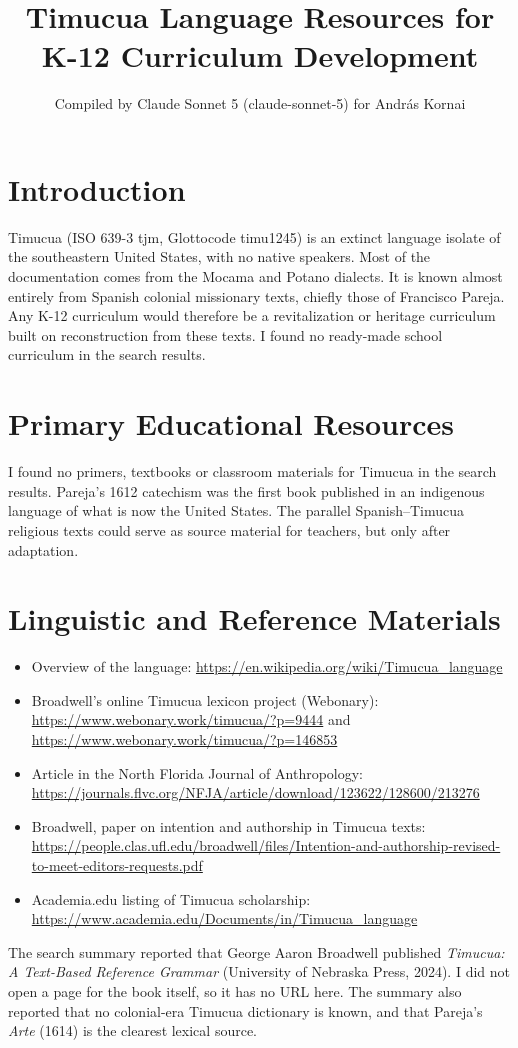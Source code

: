 \documentclass[12pt]{article}
\title{Timucua Language Resources for K-12 Curriculum Development}
\author{Compiled by Claude Sonnet 5 (claude-sonnet-5) for Andr\'as Kornai}
\date{}
\begin{document}
\maketitle

\section{Introduction}
Timucua (ISO 639-3 tjm, Glottocode timu1245) is an extinct language isolate of the southeastern United States, with no native speakers. Most of the documentation comes from the Mocama and Potano dialects. It is known almost entirely from Spanish colonial missionary texts, chiefly those of Francisco Pareja. Any K-12 curriculum would therefore be a revitalization or heritage curriculum built on reconstruction from these texts. I found no ready-made school curriculum in the search results.

\section{Primary Educational Resources}
I found no primers, textbooks or classroom materials for Timucua in the search results. Pareja's 1612 catechism was the first book published in an indigenous language of what is now the United States. The parallel Spanish--Timucua religious texts could serve as source material for teachers, but only after adaptation.

\section{Linguistic and Reference Materials}
\begin{itemize}
\item Overview of the language: \url{https://en.wikipedia.org/wiki/Timucua_language}
\item Broadwell's online Timucua lexicon project (Webonary): \url{https://www.webonary.work/timucua/?p=9444} and \url{https://www.webonary.work/timucua/?p=146853}
\item Article in the North Florida Journal of Anthropology: \url{https://journals.flvc.org/NFJA/article/download/123622/128600/213276}
\item Broadwell, paper on intention and authorship in Timucua texts: \url{https://people.clas.ufl.edu/broadwell/files/Intention-and-authorship-revised-to-meet-editors-requests.pdf}
\item Academia.edu listing of Timucua scholarship: \url{https://www.academia.edu/Documents/in/Timucua_language}
\end{itemize}
The search summary reported that George Aaron Broadwell published \emph{Timucua: A Text-Based Reference Grammar} (University of Nebraska Press, 2024). I did not open a page for the book itself, so it has no URL here. The summary also reported that no colonial-era Timucua dictionary is known, and that Pareja's \emph{Arte} (1614) is the clearest lexical source.
\end{document}
